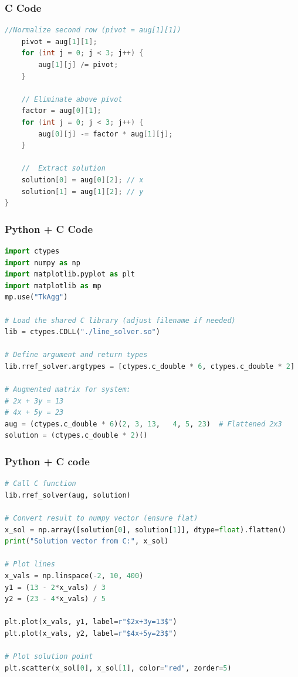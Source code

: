 \documentclass{beamer}
\begin{document}
\begin{frame}[fragile]
    \frametitle{C Code }
    \begin{lstlisting}[language=C]
    //Normalize second row (pivot = aug[1][1])
    pivot = aug[1][1];
    for (int j = 0; j < 3; j++) {
        aug[1][j] /= pivot;
    }

    // Eliminate above pivot
    factor = aug[0][1];
    for (int j = 0; j < 3; j++) {
        aug[0][j] -= factor * aug[1][j];
    }

    //  Extract solution
    solution[0] = aug[0][2]; // x
    solution[1] = aug[1][2]; // y
}

     \end{lstlisting}
\end{frame}
\begin{frame}[fragile]
    \frametitle{Python + C Code }
    \begin{lstlisting}[language=Python]
import ctypes
import numpy as np
import matplotlib.pyplot as plt
import matplotlib as mp
mp.use("TkAgg")

# Load the shared C library (adjust filename if needed)
lib = ctypes.CDLL("./line_solver.so")

# Define argument and return types
lib.rref_solver.argtypes = [ctypes.c_double * 6, ctypes.c_double * 2]

# Augmented matrix for system:
# 2x + 3y = 13
# 4x + 5y = 23
aug = (ctypes.c_double * 6)(2, 3, 13,   4, 5, 23)  # Flattened 2x3
solution = (ctypes.c_double * 2)()
    \end{lstlisting}
\end{frame}

\begin{frame}[fragile]
    \frametitle{Python + C code}

    \begin{lstlisting}[language=Python]
# Call C function
lib.rref_solver(aug, solution)

# Convert result to numpy vector (ensure flat)
x_sol = np.array([solution[0], solution[1]], dtype=float).flatten()
print("Solution vector from C:", x_sol)

# Plot lines
x_vals = np.linspace(-2, 10, 400)
y1 = (13 - 2*x_vals) / 3
y2 = (23 - 4*x_vals) / 5

plt.plot(x_vals, y1, label=r"$2x+3y=13$")
plt.plot(x_vals, y2, label=r"$4x+5y=23$")

# Plot solution point
plt.scatter(x_sol[0], x_sol[1], color="red", zorder=5)
    \end{lstlisting}
\end{frame}
\end{document}
